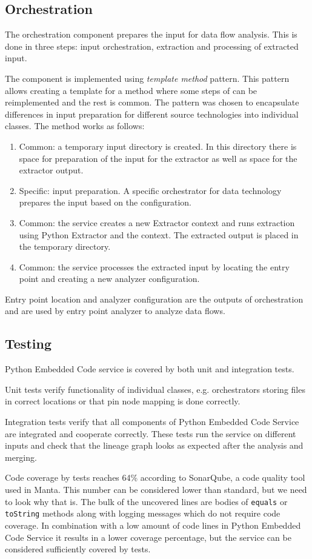 \subsection{Orchestration}
The orchestration component prepares the input for data flow analysis. This is done in three steps: input orchestration, extraction and processing of extracted input.
\par
The component is implemented using \textit{template method} pattern. This pattern allows creating a template for a method where some steps of can be reimplemented and the rest is common. The pattern was chosen to encapsulate differences in input preparation for different source technologies into individual classes. The method works as follows:
\begin{enumerate}
    \item Common: a temporary input directory is created. In this directory there is space for preparation of the input for the extractor as well as space for the extractor output.
    \item Specific: input preparation. A specific orchestrator for data technology prepares the input based on the configuration.
    \item Common: the service creates a new Extractor context and runs extraction using Python Extractor and the context. The extracted output is placed in the temporary directory.
    \item Common: the service processes the extracted input by locating the entry point and creating a new analyzer configuration.
\end{enumerate}
\par
Entry point location and analyzer configuration are the outputs of orchestration and are used by entry point analyzer to analyze data flows.

\subsection{Testing}

Python Embedded Code service is covered by both unit and integration tests.
\par
Unit tests verify functionality of individual classes, e.g. orchestrators storing files in correct locations or that pin node mapping is done correctly.
\par
Integration tests verify that all components of Python Embedded Code Service are integrated and cooperate correctly. These tests run the service on different inputs and check that the lineage graph looks as expected after the analysis and merging.
\par
Code coverage by tests reaches 64\% according to SonarQube, a code quality tool used in Manta. This number can be considered lower than standard, but we need to look why that is. The bulk of the uncovered lines are bodies of \texttt{equals} or \texttt{toString} methods along with logging messages which do not require code coverage. In combination with a low amount of code lines in Python Embedded Code Service it results in a lower coverage percentage, but the service can be considered sufficiently covered by tests.